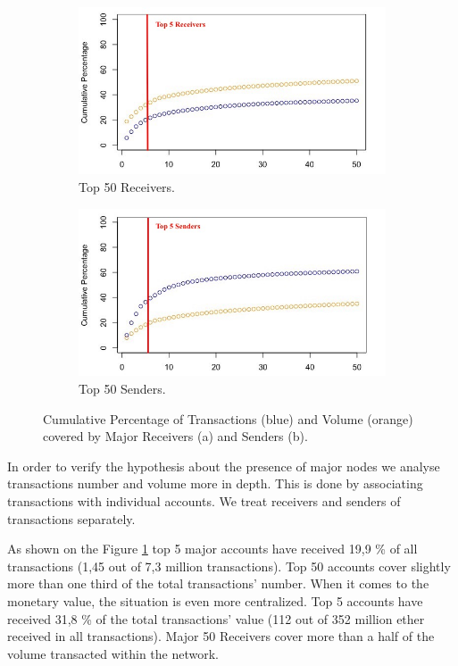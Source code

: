 \begin{figure}[h]
  \centering
  \begin{subfigure}[b]{0.49\linewidth}
    \includegraphics[width=\linewidth]{figures/major_receivers_metrics.jpeg}
    \caption{Top 50 Receivers.}
    \label{fig:major_receivers_metrics}
  \end{subfigure}
  \begin{subfigure}[b]{0.49\linewidth}
    \includegraphics[width=\linewidth]{figures/major_senders_metrics.jpeg}
    \caption{Top 50 Senders.}
    \label{fig:major_senders_metrics}
  \end{subfigure}
  \caption{Cumulative Percentage of Transactions (blue) and Volume (orange) covered by Major Receivers (a) and Senders (b).}
  \label{fig:major_metrics}
\end{figure}

In order to verify the hypothesis about the presence of major nodes we analyse transactions number and volume more in depth. 
This is done by associating transactions with individual accounts.
We treat receivers and senders of transactions separately.

As shown on the Figure \ref{fig:major_receivers_metrics} top 5 major accounts have received 19,9 \% of all transactions (1,45 out of 7,3 million transactions).
Top 50 accounts cover slightly more than one third of the total transactions' number.
When it comes to the monetary value, the situation is even more centralized.
Top 5 accounts have received 31,8 \% of the total transactions' value (112 out of 352 million ether received in all transactions).
Major 50 Receivers cover more than a half of the volume transacted within the network. 

